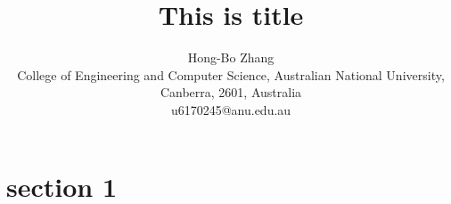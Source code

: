 \documentclass[11pt,assignment]{HONGBOANU}
\title{This is title}
\author{Hong-Bo Zhang\\
College of Engineering and Computer Science, Australian National University, Canberra, 2601, Australia\\
u6170245@anu.edu.au}
\begin{document}
\newpage
\section{section 1}




\acknowledgments

\appendix


\begin{thebibliography}{999}
\end{thebibliography}
\end{document}
